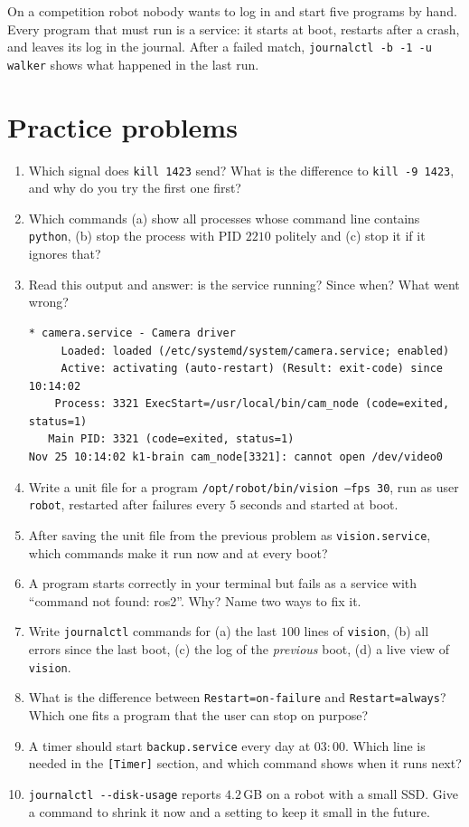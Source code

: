 \begin{aibox}
On a competition robot nobody wants to log in and start five programs by hand. Every program that must run is a service: it starts at boot, restarts after a crash, and leaves its log in the journal. After a failed match, \verb|journalctl -b -1 -u walker| shows what happened in the last run.
\end{aibox}

\section*{Practice problems}
\begin{enumerate}[label=\textbf{\thechapter.\arabic*}]
  \item Which signal does \verb|kill 1423| send? What is the difference to \verb|kill -9 1423|, and why do you try the first one first?
  \item Which commands (a) show all processes whose command line contains \texttt{python}, (b) stop the process with PID $2210$ politely and (c) stop it if it ignores that?
  \item Read this output and answer: is the service running? Since when? What went wrong?
\begin{verbatim}
* camera.service - Camera driver
     Loaded: loaded (/etc/systemd/system/camera.service; enabled)
     Active: activating (auto-restart) (Result: exit-code) since 10:14:02
    Process: 3321 ExecStart=/usr/local/bin/cam_node (code=exited, status=1)
   Main PID: 3321 (code=exited, status=1)
Nov 25 10:14:02 k1-brain cam_node[3321]: cannot open /dev/video0
\end{verbatim}
  \item Write a unit file for a program \texttt{/opt/robot/bin/vision --fps 30}, run as user \texttt{robot}, restarted after failures every $5$ seconds and started at boot.
  \item After saving the unit file from the previous problem as \texttt{vision.service}, which commands make it run now and at every boot?
  \item A program starts correctly in your terminal but fails as a service with ``command not found: ros2''. Why? Name two ways to fix it.
  \item Write \texttt{journalctl} commands for (a) the last $100$ lines of \texttt{vision}, (b) all errors since the last boot, (c) the log of the \emph{previous} boot, (d) a live view of \texttt{vision}.
  \item What is the difference between \texttt{Restart=on-failure} and \texttt{Restart=always}? Which one fits a program that the user can stop on purpose?
  \item A timer should start \texttt{backup.service} every day at $03:00$. Which line is needed in the \texttt{[Timer]} section, and which command shows when it runs next?
  \item[\textbf{\thechapter.10}$\star$] \verb|journalctl --disk-usage| reports $4.2$\,GB on a robot with a small SSD. Give a command to shrink it now and a setting to keep it small in the future.
\end{enumerate}
